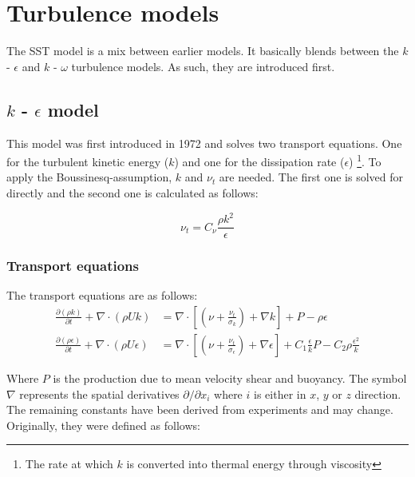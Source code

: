 \section{Turbulence models}
\label{sec:turb_models}
The SST model is a mix between earlier models. It basically blends between the
$k$ - $\epsilon$ and $k$ - $\omega$ turbulence models. As such, they are
introduced first.




\subsection{$k$ - $\epsilon$ model}
This model was first introduced in 1972 and solves two transport equations.
\cite{JONES1972301} One for the turbulent kinetic energy ($k$) and one for the
dissipation rate ($\epsilon$) \footnote{The rate at which $k$ is converted into
thermal energy through viscosity}. To apply the Boussinesq-assumption, $k$ and
$\nu_t$ are needed. The first one is solved for directly and the second one is
calculated as follows:



\begin{equation}
    \label{eq:k_epsilon_nu_t}
    \nu_t = C_{\nu} \frac{\rho k^2}{\epsilon}
\end{equation}


\subsubsection{Transport equations}
\noindent The transport equations are as follows:
\begin{align}
    \label{eq:transport_k}
    \frac{\partial (\rho k)}{\partial t} + 
    \nabla \cdot (\rho U k) &=
    \nabla \cdot \left[ 
        \left( \nu + \frac{\nu_t}{\sigma_k}\right) + \nabla k 
    \right] + P - \rho \epsilon \\
%
    \label{eq:tranport_epsilon}
    \frac{\partial (\rho \epsilon)}{\partial t} + 
    \nabla \cdot (\rho U \epsilon) &=
    \nabla \cdot \left[ 
        \left( \nu + \frac{\nu_t}{\sigma_{\epsilon}}\right) + \nabla  \epsilon
    \right] + C_1 \frac{\epsilon}{k}P - 
    C_2 \rho \frac{\epsilon^2}{k}
\end{align}

\noindent Where $P$ is the production due to mean velocity shear and buoyancy.
The symbol $\nabla$ represents the spatial derivatives $\partial / \partial
x_i$ where $i$ is either in $x$, $y$ or $z$ direction. The remaining constants
have been derived from experiments and may change. Originally, they were
defined as follows:

